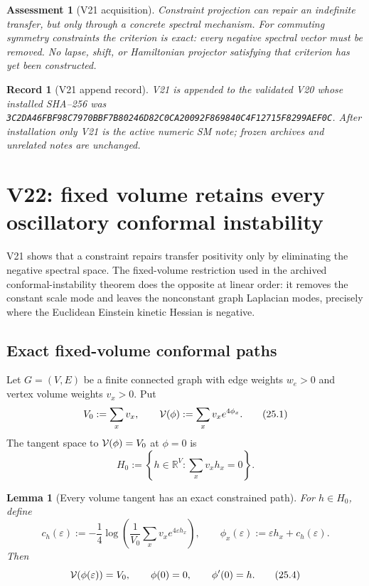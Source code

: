 \documentclass[11pt]{article}
\newtheorem{lemma}[theorem]{Lemma}
\newtheorem{assessment}[theorem]{Assessment}
\newtheorem{record}[theorem]{Record}
\theoremstyle{remark}
\begin{document}
\begin{assessment}[V21 acquisition]
\label{ass:v19v21}
Constraint projection can repair an indefinite transfer, but only through
a concrete spectral mechanism.  For commuting symmetry constraints the
criterion is exact: every negative spectral vector must be removed.  No
lapse, shift, or Hamiltonian projector satisfying that criterion has yet
been constructed.
\end{assessment}

\begin{record}[V21 append record]
\label{rec:v19v21}
V21 is appended to the validated V20 whose installed SHA--256 was
\texttt{3C2DA46FBF98C7970BBF7B80246D82C0CA20092F869840C4F12715F8299AEF0C}.
After installation only V21 is the active numeric SM note; frozen archives
and unrelated notes are unchanged.
\end{record}



\section{V22: fixed volume retains every oscillatory conformal instability}
\label{sec:v19v22}

V21 shows that a constraint repairs transfer positivity only by eliminating
the negative spectral space.  The fixed-volume restriction used in the
archived conformal-instability theorem does the opposite at linear order:
it removes the constant scale mode and leaves the nonconstant graph
Laplacian modes, precisely where the Euclidean Einstein kinetic Hessian is
negative.

\subsection{Exact fixed-volume conformal paths}

Let \(G=(V,E)\) be a finite connected graph with edge weights \(w_e>0\)
and vertex volume weights \(v_x>0\).  Put
\[
 V_0:=\sum_xv_x,\qquad
 {\cal V}(\phi):=\sum_xv_xe^{4\phi_x}.                         \tag{25.1}
\]
The tangent space to \({\cal V}(\phi)=V_0\) at \(\phi=0\) is
\[
 H_0:=\left\{h\in\mathbb R^V:\sum_xv_xh_x=0\right\}.           \tag{25.2}
\]

\begin{lemma}[Every volume tangent has an exact constrained path]
\label{lem:v19v22-path}
For \(h\in H_0\), define
\[
 c_h(\varepsilon)
 :=-\frac14\log\left(
 \frac1{V_0}\sum_xv_xe^{4\varepsilon h_x}\right),
 \qquad
 \phi_x(\varepsilon):=\varepsilon h_x+c_h(\varepsilon).       \tag{25.3}
\]
Then
\[
 {\cal V}(\phi(\varepsilon))=V_0,\qquad
 \phi(0)=0,\qquad \phi'(0)=h.                                 \tag{25.4}
\]
\end{lemma}
\end{document}
